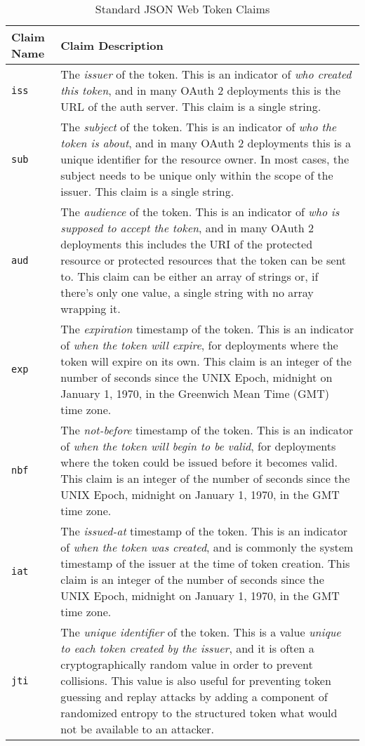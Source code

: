 \begin{table}
    \begin{tabularx}{\linewidth}{l | X}
        \textbf{Claim Name} & \textbf{Claim Description} \\
        \hline
        \texttt{iss} & The \textit{issuer} of the token. This is an indicator of \textit{who created this token}, and in many OAuth 2 deployments this is the URL of the auth server. This claim is a single string. \\
        \texttt{sub} & The \textit{subject} of the token. This is an indicator of \textit{who the token is about}, and in many OAuth 2 deployments this is a unique identifier for the resource owner. In most cases, the subject needs to be unique only within the scope of the issuer. This claim is a single string. \\
        \texttt{aud} & The \textit{audience} of the token. This is an indicator of \textit{who is supposed to accept the token}, and in many OAuth 2 deployments this includes the URI of the protected resource or protected resources that the token can be sent to. This claim can be either an array of strings or, if there's only one value, a single string with no array wrapping it. \\
        \texttt{exp} & The \textit{expiration} time\-stamp of the token. This is an indicator of \textit{when the token will expire}, for deployments where the token will expire on its own. This claim is an integer of the number of seconds since the UNIX Epoch, midnight on January 1, 1970, in the Greenwich Mean Time (GMT) time zone. \\
        \texttt{nbf} & The \textit{not-before} time\-stamp of the token. This is an indicator of \textit{when the token will begin to be valid}, for deployments where the token could be issued before it becomes valid. This claim is an integer of the number of seconds since the UNIX Epoch, midnight on January 1, 1970, in the GMT time zone. \\
        \texttt{iat} & The \textit{issued-at} time\-stamp of the token. This is an indicator of \textit{when the token was created}, and is commonly the system time\-stamp of the issuer at the time of token creation. This claim is an integer of the number of seconds since the UNIX Epoch, midnight on January 1, 1970, in the GMT time zone. \\
        \texttt{jti} & The \textit{unique identifier} of the token. This is a value \textit{unique to  each token created by the issuer}, and it is often a cryptographically random value in order to prevent collisions. This value is also useful for preventing token guessing and replay attacks by adding a component of randomized entropy to the structured token what would not be available to an attacker.
    \end{tabularx}
    \caption{Standard JSON Web Token Claims\label{tbl:jwt-claims}}
\end{table}

